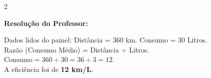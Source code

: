 \begin{multicols*}{2}
\ifgabarito
    \begin{tcolorbox}[colback=CorTitUm!5, colframe=CorTitUm, boxrule=1pt, arc=4pt, left=6pt, right=6pt, top=6pt, bottom=6pt]
    \small\textbf{\textcolor{CorTitUm}{Resolução do Professor:}}\par\vspace{0.1cm}
    \color{CinzaEscuro}
    Dados lidos do painel: Distância = $ 360 $ km. Consumo = $ 30 $ Litros.\\
    Razão (Consumo Médio) = Distância $ \div $ Litros.\\
    $ \text{Consumo} = 360 \div 30 = 36 \div 3 = 12 $.\\
    A eficiência foi de \textbf{12 km/L}.
    \end{tcolorbox}
\fi

\par\vspace{\espacoQuestao}

\end{multicols*}
